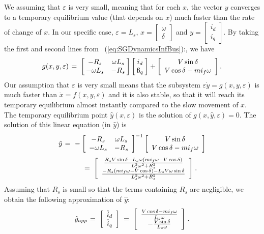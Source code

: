 \documentclass[conference]{IEEEtran}
\newcommand{\BE}{\begin{equation}}
\newcommand{\BEQ}[1]{\BE\label{#1}} %
\newcommand{\rfb}[1]{\mbox{\rm
   (\ref{#1})}\ifx\undefined\stillediting\else:\fbox{$#1$}\fi}
\renewcommand{\o}    {{\omega}}
\newcommand{\e}      {{\varepsilon}}
\newcommand{\m}      {{\hbox{\hskip 1pt}}}
\newcommand{\nm}     {{\hbox{\hskip -3pt}}}
\begin{document}
We assuming that $\e$ is very small, meaning that for each $x$, the 
vector $y$ converges to a temporary equilibrium value (that depends on
$x$) much faster than the rate of change of $x$. In our specific case,
$\e=L_s$, $x=\left[\begin{array}{c} \o\\ \delta\end{array}\right]$ and
$y=\left[\begin{array}{c} i_d\\ i_q \end{array}\right]$. By taking the
first and second lines from \rfb{eq:SGDynamicsInfBus}, we have
$$ g(x,y,\e) \m=\m \left[\nm \begin{array}{cc} -R_s & \o L_s\\ -\o 
   L_s & -R_s \end{array}\nm\right] \left[\nm \begin{array}{c} i_d\\ 
   \i_q \end{array} \nm\right]+\left[\begin{array}{c} V\sin\delta\\ 
   V\cos\delta - mi_f\o \end{array}\right].$$
Our assumption that $\e$ is very small means that the subsystem $\e
\dot{y}=g(x,y,\e)$ is much faster than $\dot{x}=f(x,y,\e)$ and it is 
also stable, so that it will reach its temporary equilibrium almost 
instantly compared to the slow movement of $x$. The temporary 
equilibrium point $\hat{y}(x,\e)$ is the solution of $g(x,\hat y,\e)=
0$. The solution of this linear equation (in $\hat{y}$) is
$$ \hat{y} \m=\m -\left[\begin{array}{cc} -R_s & \o L_s\\
   -\o L_s & -R_s \end{array}\right]^{-1}\left[\begin{array}{cc}
   V\sin\delta\\ V\cos\delta - mi_f\o \end{array}\right]$$
$$ \m\qquad=\m \left[\begin{array}{cc} \frac{R_s V\sin\delta - L_s\o
   \left(mi_f\o - V\cos\delta\right)}{L_s^{2}\o^2+R_s^2}\\
   \frac{-R_s\left(mi_f\o - V\cos\delta\right) - L_s V\o\sin\delta}
   {L_s^2\o^2 + R_s^2} \end{array}\right] \m.$$
Assuming that $R_s$ is small so that the terms containing $R_s$ are
negligible, we obtain the following approximation of $\hat y$:
\BEQ{eq:ISEInfBusEstimatedCurrents}
   \hat{y}_{app} \m=\m \left[\begin{array}{c} \hat{i}_d\\
   \hat{i}_q \end{array}\right] \m=\m \left[\begin{array}{c}
   \frac{V\cos\delta - mi_f\o}{L_s\o}\\ -\frac{V\sin\delta}{L_s\o}
   \end{array}\right] \m.
\end{equation}
\end{document}
